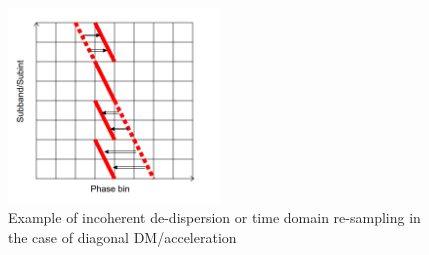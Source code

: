 \documentclass[thesis_msc.tex]{subfiles}
\begin{document}
    \begin{figure}[h!]
\centering
\includegraphics[width=0.5\textwidth]{figures/4bins.png}
\caption{Example of incoherent de-dispersion or time domain re-sampling in the case of diagonal DM/acceleration  }\label{diag}
\end{figure}

     
     




\end{document}
